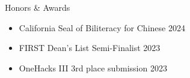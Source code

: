 \documentclass[
	11pt, %
]{tex/resume} %
\begin{document}

\begin{rSection}{Honors \& Awards}

    \begin{itemize}
        \setlength\itemsep{-0.7em} %
        \item California Seal of Biliteracy for Chinese \hfill 2024
        \item FIRST Dean's List Semi-Finalist \hfill 2023
        \item OneHacks III 3rd place submission \hfill 2023


    \end{itemize}

\end{rSection}





\end{document}
